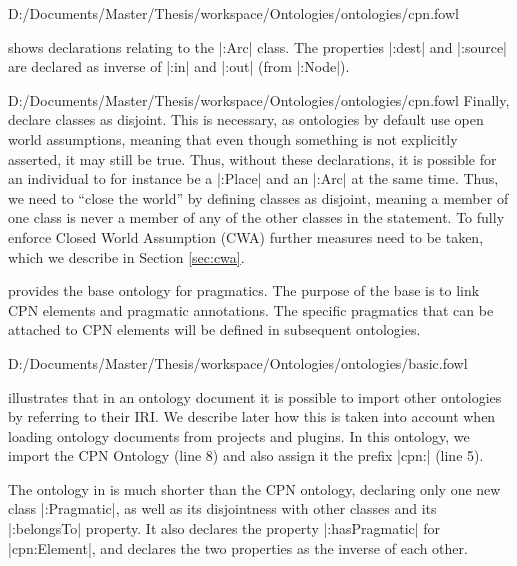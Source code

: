 
{D:/Documents/Master/Thesis/workspace/Ontologies/ontologies/cpn.fowl} 

 shows declarations relating to the |:Arc| class. The
properties |:dest| and |:source| are declared as inverse of |:in| and |:out|
(from |:Node|).


{D:/Documents/Master/Thesis/workspace/Ontologies/ontologies/cpn.fowl} Finally,
 declare classes as disjoint. This is necessary, as
ontologies by default use open world assumptions, meaning that even though
something is not explicitly asserted, it may still be true. Thus, without these
declarations, it is possible for an individual to for instance be a |:Place| and
an |:Arc| at the same time. Thus, we need to ``close the world'' by defining
classes as disjoint, meaning a member of one class is never a member of any of
the other classes in the statement. To fully enforce Closed World Assumption
(CWA) further measures need to be taken, which we describe in Section
\ref{sec:cwa}.

 provides the base ontology for pragmatics. The purpose of the
base is to link CPN elements and pragmatic annotations. The specific pragmatics
that can be attached to CPN elements will be defined in subsequent ontologies.
 

{D:/Documents/Master/Thesis/workspace/Ontologies/ontologies/basic.fowl}

 illustrates that in an ontology document it is possible to
import other ontologies by referring to their IRI.  We describe later how this
is taken into account when loading ontology documents from projects and plugins.
In this ontology, we import the CPN Ontology (line 8) and also assign it the
prefix |cpn:| (line 5).

The ontology in  is much shorter than the CPN ontology,
declaring only one new class |:Pragmatic|, as well as its disjointness with
other classes and its |:belongsTo| property. It also declares the property
|:hasPragmatic| for |cpn:Element|, and declares the two properties as the
inverse of each other.

